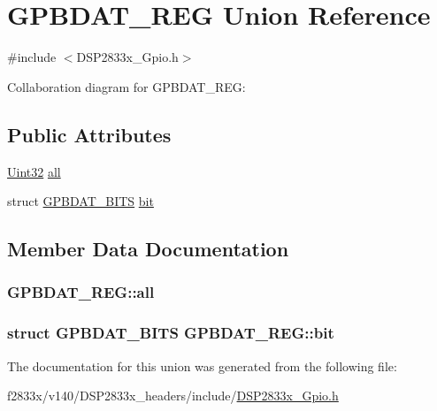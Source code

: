 \hypertarget{union_g_p_b_d_a_t___r_e_g}{}\section{G\+P\+B\+D\+A\+T\+\_\+\+R\+E\+G Union Reference}
\label{union_g_p_b_d_a_t___r_e_g}


{\ttfamily \#include $<$D\+S\+P2833x\+\_\+\+Gpio.\+h$>$}



Collaboration diagram for G\+P\+B\+D\+A\+T\+\_\+\+R\+E\+G\+:
\subsection*{Public Attributes}
\begin{DoxyCompactItemize}
\item 
\hyperlink{_d_s_p2833x___device_8h_aba99025e657f892beb7ff31cecf64653}{Uint32} \hyperlink{union_g_p_b_d_a_t___r_e_g_a23e77e094dc4db8362dd12feda55a219}{all}
\item 
struct \hyperlink{struct_g_p_b_d_a_t___b_i_t_s}{G\+P\+B\+D\+A\+T\+\_\+\+B\+I\+T\+S} \hyperlink{union_g_p_b_d_a_t___r_e_g_ace89803ea35885e7876a1c3b5f2bf5e9}{bit}
\end{DoxyCompactItemize}


\subsection{Member Data Documentation}
\hypertarget{union_g_p_b_d_a_t___r_e_g_a23e77e094dc4db8362dd12feda55a219}{}
\subsubsection[{all}]{ G\+P\+B\+D\+A\+T\+\_\+\+R\+E\+G\+::all}\label{union_g_p_b_d_a_t___r_e_g_a23e77e094dc4db8362dd12feda55a219}
\hypertarget{union_g_p_b_d_a_t___r_e_g_ace89803ea35885e7876a1c3b5f2bf5e9}{}
\subsubsection[{bit}]{\setlength{\rightskip}{0pt plus 5cm}struct {\bf G\+P\+B\+D\+A\+T\+\_\+\+B\+I\+T\+S} G\+P\+B\+D\+A\+T\+\_\+\+R\+E\+G\+::bit}\label{union_g_p_b_d_a_t___r_e_g_ace89803ea35885e7876a1c3b5f2bf5e9}


The documentation for this union was generated from the following file\+:\begin{DoxyCompactItemize}
\item 
f2833x/v140/\+D\+S\+P2833x\+\_\+headers/include/\hyperlink{_d_s_p2833x___gpio_8h}{D\+S\+P2833x\+\_\+\+Gpio.\+h}\end{DoxyCompactItemize}
